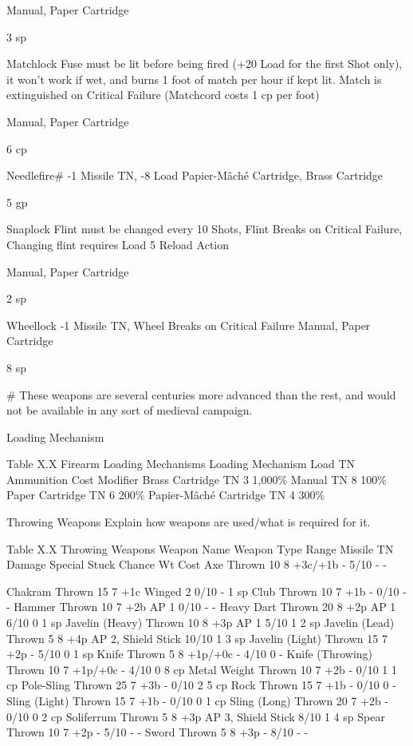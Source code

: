 \documentclass[oneside,11pt,english]{book}
\begin{document}
Manual, Paper 
Cartridge 

3 sp 

Matchlock Fuse must be lit before being fired (+20 Load for the first Shot only), it won’t 
work if wet, and burns 1 foot of match per hour if kept lit. Match is 
extinguished on Critical Failure (Matchcord costs 1 cp per foot) 

Manual, Paper 
Cartridge 

6 cp 

Needlefire\# -1 Missile TN, -8 Load Papier-Mâché 
Cartridge, Brass 
Cartridge 

5 gp 

Snaplock Flint must be changed every 10 Shots, Flint Breaks on Critical Failure, 
Changing flint requires Load 5 Reload Action 

Manual, Paper 
Cartridge 

2 sp 

Wheellock -1 Missile TN, Wheel Breaks on Critical Failure Manual, Paper 
Cartridge 

8 sp 

\# These weapons are several centuries more advanced than the rest, and would not be available in any sort of medieval campaign. 

 

Loading Mechanism 

 
Table X.X Firearm Loading Mechanisms 
Loading Mechanism Load TN Ammunition Cost Modifier 
Brass Cartridge TN 3 1,000\% 
Manual TN 8 100\% 
Paper Cartridge TN 6 200\% 
Papier-Mâché Cartridge TN 4 300\% 

 

Throwing Weapons 
Explain how weapons are used/what is required for it. 

 
Table X.X Throwing Weapons 
Weapon Name Weapon Type Range Missile TN Damage Special Stuck Chance Wt Cost 
Axe Thrown 10 8 +3c/+1b - 5/10 - - 


Chakram Thrown 15 7 +1c Winged 2 0/10 - 1 sp 
Club Thrown 10 7 +1b - 0/10 - - 
Hammer Thrown 10 7 +2b AP 1 0/10 - - 
Heavy Dart Thrown 20 8 +2p AP 1 6/10 0 1 sp 
Javelin (Heavy) Thrown 10 8 +3p AP 1 5/10 1 2 sp 
Javelin (Lead) Thrown 5 8 +4p AP 2, Shield Stick 10/10 1 3 sp 
Javelin (Light) Thrown 15 7 +2p - 5/10 0 1 sp 
Knife Thrown 5 8 +1p/+0c - 4/10 0 - 
Knife (Throwing) Thrown 10 7 +1p/+0c - 4/10 0 8 cp 
Metal Weight Thrown 10 7 +2b - 0/10 1 1 cp 
Pole-Sling Thrown 25 7 +3b - 0/10 2 5 cp 
Rock Thrown 15 7 +1b - 0/10 0 - 
Sling (Light) Thrown 15 7 +1b - 0/10 0 1 cp 
Sling (Long) Thrown 20 7 +2b - 0/10 0 2 cp 
Soliferrum Thrown 5 8 +3p AP 3, Shield Stick 8/10 1 4 sp 
Spear Thrown 10 7 +2p - 5/10 - - 
Sword Thrown 5 8 +3p - 8/10 - - 
\end{document}
